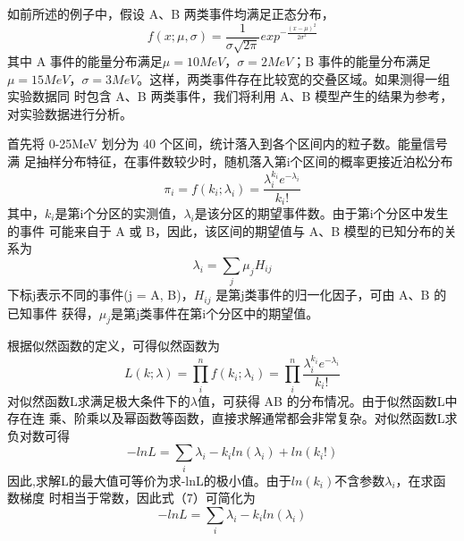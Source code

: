 \documentclass[10pt,a4paper,twoside,UTF8]{ctexart}
\begin{document}
如前所述的例子中，假设 A、B 两类事件均满足正态分布，
\begin{equation}
	f(x;\mu,\sigma)=\frac{1}{\sigma \sqrt{2\pi}}exp^{-\frac{(x-\mu)^{2}}{2\sigma^{2}}}
\end{equation}
其中 A 事件的能量分布满足$\mu = 10MeV$，$\sigma = 2MeV$；B 事件的能量分布满足$\mu =
15MeV$，$\sigma = 3MeV$。这样，两类事件存在比较宽的交叠区域。如果测得一组实验数据同
时包含 A、B 两类事件，我们将利用 A、B 模型产生的结果为参考，对实验数据进行分析。

首先将 0-25MeV 划分为 40 个区间，统计落入到各个区间内的粒子数。能量信号满
足抽样分布特征，在事件数较少时，随机落入第i个区间的概率更接近泊松分布
\begin{equation}
	\pi_i=f(k_i;\lambda_i)=\frac{\lambda_i^{k_i} e^{-\lambda_i}}{k_i!}
\end{equation}
其中，$k_i$是第i个分区的实测值，$\lambda_i$是该分区的期望事件数。由于第i个分区中发生的事件
可能来自于 A 或 B，因此，该区间的期望值与 A、B 模型的已知分布的关系为
\begin{equation}
	\lambda_i=\sum_{j} \mu_j H_{ij} 
\end{equation}
下标j表示不同的事件(j = A, B)，$H_{ij}$ 是第j类事件的归一化因子，可由 A、B 的已知事件
获得，$\mu_j$是第j类事件在第i个分区中的期望值。

根据似然函数的定义，可得似然函数为
\begin{equation}
	L(k;\lambda)=\prod_{i}^{n} f(k_i;\lambda_i)=\prod_{i}^{n} \frac{\lambda_i^{k_i} e^{-\lambda_i}}{k_i!}
\end{equation}
对似然函数L求满足极大条件下的$\lambda$值，可获得 AB 的分布情况。由于似然函数L中存在连
乘、阶乘以及幂函数等函数，直接求解通常都会非常复杂。对似然函数L求负对数可得
\begin{equation}
	-lnL=\sum_{i} \lambda_i-k_i ln(\lambda_i)+ln(k_i!)
\end{equation}
因此,求解L的最大值可等价为求-lnL的极小值。由于$ln(k_i)$不含参数$\lambda_i$，在求函数梯度
时相当于常数，因此式（7）可简化为
\begin{equation}
	-lnL=\sum_{i}\lambda_i-k_iln(\lambda_i)
\end{equation}
\end{document}

